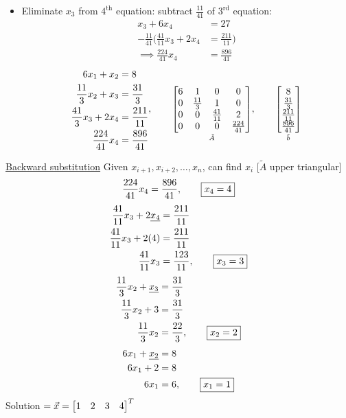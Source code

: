\documentclass[]{article}
\begin{document}
\begin{example}
\begin{itemize}
		\item Eliminate $x_3$ from $4^\text{th}$ equation: subtract $\frac{11}{41}$ of $3^\text{rd}$ equation:
			\begin{align*}
				x_3 + 6x_4 &= 27 \\
				-\frac{11}{41}\bigg(\frac{41}{11}x_3+2x_4 &= \frac{211}{11}\bigg) \\
				\implies \frac{224}{41}x_4 &= \frac{896}{41}
			\end{align*}
			$$\begin{aligned}
				6x_1 + x_2 &= 8 \\
				\frac{11}3 x_2 + x_3 &= \frac{31}3 \\
				\frac{41}3 x_3 + 2x_4 &= \frac{211}{11} \\
				\frac{224}{41} x_4 &= \frac{896}{41}
			\end{aligned}, \qquad
			\underset{\tilde A}{\begin{bmatrix}6&1&0&0\\0&\frac{11}3&1&0\\0&0&\frac{41}{11}&2\\0&0&0&\frac{224}{41}\end{bmatrix}},\qquad \underset{\tilde b}{\begin{bmatrix}8\\\frac{31}3\\\frac{211}{11}\\\frac{896}{41}\end{bmatrix}} $$
	\end{itemize}
	\ul{Backward substitution}
	Given $x_{i+1},x_{i+2},\dots,x_n$, can find $x_i$ [$\tilde A$ upper triangular]
	\begin{align*}
		\frac{224}{41}x_4 = \frac{896}{41}, \qquad
		\fbox{$x_4 = 4$}
	\end{align*}
	\begin{align*}
		\frac{41}{11} x_3 + 2\underline{x_4} &= \frac{211}{11} \\
		\frac{41}{11} x_3 + 2(4) &= \frac{211}{11} \\
		\frac{41}{11} x_3 &= \frac{123}{11}, \qquad
		\fbox{$x_3 = 3$}
	\end{align*}
	\begin{align*}
		\frac{11}3 x_2 + \underline{x_3} &= \frac{31}3 \\
		\frac{11}3 x_2 + 3 &= \frac{31}3 \\
		\frac{11}3 x_2 &= \frac{22}3, \qquad
		\fbox{$x_2=2$}
	\end{align*}
	\begin{align*}
		6x_1 + \underline{x_2} &= 8 \\
		6x_1 + 2 &= 8 \\
		6x_1 &= 6, \qquad
		\fbox{$x_1=1$}
	\end{align*}
	Solution $=\vec{x}=\begin{bmatrix}1&2&3&4\end{bmatrix}^T$
\end{example}
\end{document}
